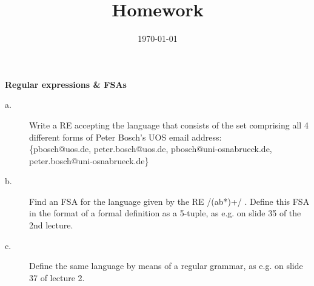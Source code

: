 \documentclass[11pt]{article}
\title{Homework \hwnumber} %
\author{\myname} %
\date{\textbf{\mycourse} \hfill {\today} \hfill \textbf{\semesteryear}} %
\begin{document}
\thispagestyle{empty} %

\clearpage %
\maketitle


\begin{problem}{1}
\textbf{Regular expressions \& FSAs}
\begin{description}
	\item[a.] Write a RE accepting the language that consists of the set comprising all 4 different forms of Peter Bosch's UOS email address: \\
	\textsf{ \{pbosch@uos.de, peter.bosch@uos.de, pbosch@uni‐osnabrueck.de, peter.bosch@uni‐osnabrueck.de\} }
 
	\item[b.] Find an FSA for the language given by the RE /(ab*)+/ . Define this FSA in the format of a formal definition as a 5-tuple, as e.g. on slide 35 of the 2nd lecture.
	\item[c.] Define the same language by means of a regular grammar, as e.g. on slide 37 of lecture 2.
\end{description}
\end{problem}
\end{document}

